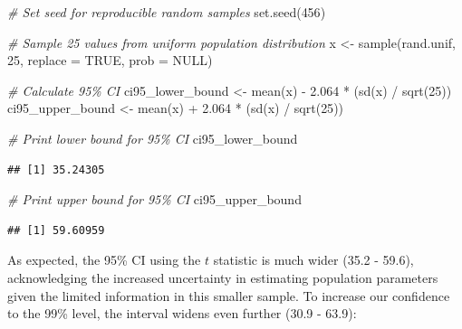 \documentclass[
]{book}
\newenvironment{Shaded}{\begin{snugshade}}{\end{snugshade}}
\newcommand{\AttributeTok}[1]{\textcolor[rgb]{0.77,0.63,0.00}{#1}}
\newcommand{\CommentTok}[1]{\textcolor[rgb]{0.56,0.35,0.01}{\textit{#1}}}
\newcommand{\ConstantTok}[1]{\textcolor[rgb]{0.00,0.00,0.00}{#1}}
\newcommand{\DecValTok}[1]{\textcolor[rgb]{0.00,0.00,0.81}{#1}}
\newcommand{\FloatTok}[1]{\textcolor[rgb]{0.00,0.00,0.81}{#1}}
\newcommand{\FunctionTok}[1]{\textcolor[rgb]{0.00,0.00,0.00}{#1}}
\newcommand{\NormalTok}[1]{#1}
\newcommand{\OtherTok}[1]{\textcolor[rgb]{0.56,0.35,0.01}{#1}}
\newcommand{\SpecialCharTok}[1]{\textcolor[rgb]{0.00,0.00,0.00}{#1}}
\begin{document}
\begin{Shaded}
\begin{Highlighting}[]
\CommentTok{\# Set seed for reproducible random samples}
\FunctionTok{set.seed}\NormalTok{(}\DecValTok{456}\NormalTok{)}

\CommentTok{\# Sample 25 values from uniform population distribution}
\NormalTok{x }\OtherTok{\textless{}{-}} \FunctionTok{sample}\NormalTok{(rand.unif, }\DecValTok{25}\NormalTok{, }\AttributeTok{replace =} \ConstantTok{TRUE}\NormalTok{, }\AttributeTok{prob =} \ConstantTok{NULL}\NormalTok{)}

\CommentTok{\# Calculate 95\% CI}
\NormalTok{ci95\_lower\_bound }\OtherTok{\textless{}{-}} \FunctionTok{mean}\NormalTok{(x) }\SpecialCharTok{{-}} \FloatTok{2.064} \SpecialCharTok{*}\NormalTok{ (}\FunctionTok{sd}\NormalTok{(x) }\SpecialCharTok{/} \FunctionTok{sqrt}\NormalTok{(}\DecValTok{25}\NormalTok{))}
\NormalTok{ci95\_upper\_bound }\OtherTok{\textless{}{-}} \FunctionTok{mean}\NormalTok{(x) }\SpecialCharTok{+} \FloatTok{2.064} \SpecialCharTok{*}\NormalTok{ (}\FunctionTok{sd}\NormalTok{(x) }\SpecialCharTok{/} \FunctionTok{sqrt}\NormalTok{(}\DecValTok{25}\NormalTok{))}
\end{Highlighting}
\end{Shaded}

\begin{Shaded}
\begin{Highlighting}[]
\CommentTok{\# Print lower bound for 95\% CI}
\NormalTok{ci95\_lower\_bound}
\end{Highlighting}
\end{Shaded}

\begin{verbatim}
## [1] 35.24305
\end{verbatim}

\begin{Shaded}
\begin{Highlighting}[]
\CommentTok{\# Print upper bound for 95\% CI}
\NormalTok{ci95\_upper\_bound}
\end{Highlighting}
\end{Shaded}

\begin{verbatim}
## [1] 59.60959
\end{verbatim}

As expected, the 95\% CI using the \(t\) statistic is much wider (35.2 - 59.6), acknowledging the increased uncertainty in estimating population parameters given the limited information in this smaller sample. To increase our confidence to the 99\% level, the interval widens even further (30.9 - 63.9):
\end{document}
